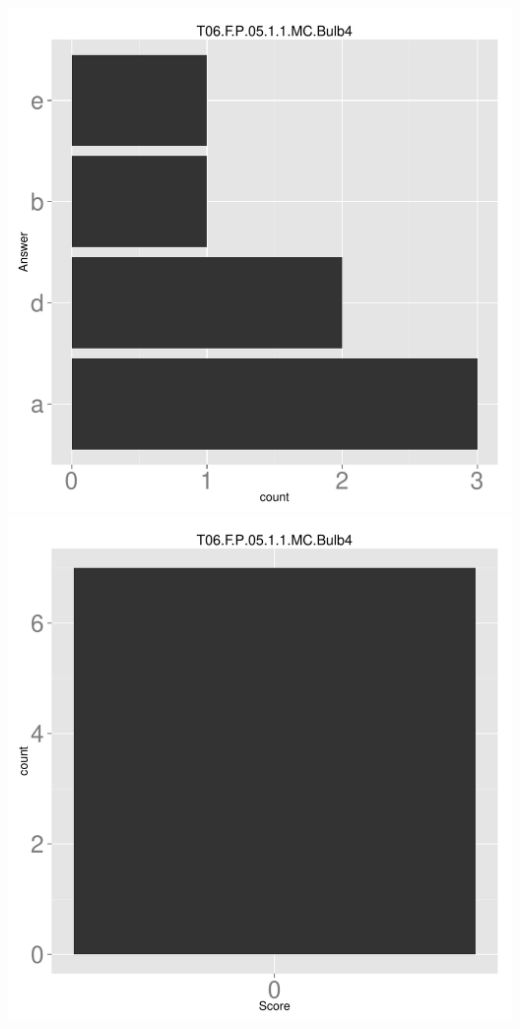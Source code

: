 \documentclass[12pt,english,nohyper]{tufte-handout}\usepackage[]{graphicx}\usepackage[]{color}
\begin{document}
\begin{center} \includegraphics[width=.45\linewidth]{Topic06_AB_61_answer} \includegraphics[width=.45\linewidth]{Topic06_AB_61_score} \end{center} 
\end{document}

